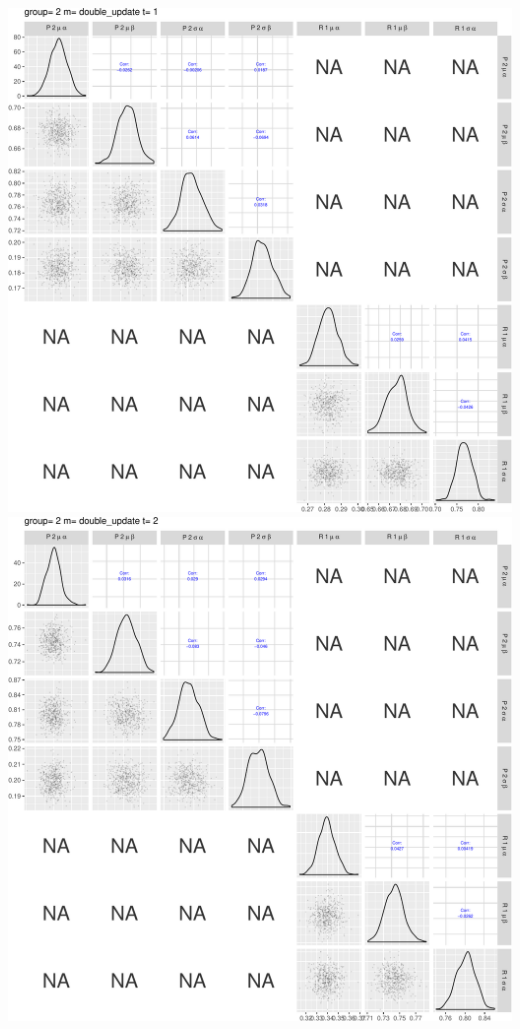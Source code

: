 \documentclass[]{article}
\begin{document}
\includegraphics{compare_models_files/figure-latex/PairsPlots-10.pdf}
\includegraphics{compare_models_files/figure-latex/PairsPlots-11.pdf}
\end{document}
